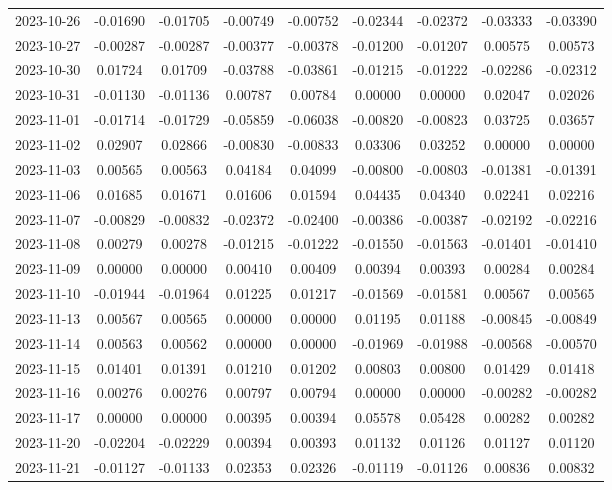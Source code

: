 {\begin{footnotesize}
\begin{longtable}{lcccccccc}
2023-10-26 & -0.01690 & -0.01705 & -0.00749 & -0.00752 & -0.02344 & -0.02372 & -0.03333 & -0.03390 \\
2023-10-27 & -0.00287 & -0.00287 & -0.00377 & -0.00378 & -0.01200 & -0.01207 & 0.00575 & 0.00573 \\
2023-10-30 & 0.01724 & 0.01709 & -0.03788 & -0.03861 & -0.01215 & -0.01222 & -0.02286 & -0.02312 \\
2023-10-31 & -0.01130 & -0.01136 & 0.00787 & 0.00784 & 0.00000 & 0.00000 & 0.02047 & 0.02026 \\
2023-11-01 & -0.01714 & -0.01729 & -0.05859 & -0.06038 & -0.00820 & -0.00823 & 0.03725 & 0.03657 \\
2023-11-02 & 0.02907 & 0.02866 & -0.00830 & -0.00833 & 0.03306 & 0.03252 & 0.00000 & 0.00000 \\
2023-11-03 & 0.00565 & 0.00563 & 0.04184 & 0.04099 & -0.00800 & -0.00803 & -0.01381 & -0.01391 \\
2023-11-06 & 0.01685 & 0.01671 & 0.01606 & 0.01594 & 0.04435 & 0.04340 & 0.02241 & 0.02216 \\
2023-11-07 & -0.00829 & -0.00832 & -0.02372 & -0.02400 & -0.00386 & -0.00387 & -0.02192 & -0.02216 \\
2023-11-08 & 0.00279 & 0.00278 & -0.01215 & -0.01222 & -0.01550 & -0.01563 & -0.01401 & -0.01410 \\
2023-11-09 & 0.00000 & 0.00000 & 0.00410 & 0.00409 & 0.00394 & 0.00393 & 0.00284 & 0.00284 \\
2023-11-10 & -0.01944 & -0.01964 & 0.01225 & 0.01217 & -0.01569 & -0.01581 & 0.00567 & 0.00565 \\
2023-11-13 & 0.00567 & 0.00565 & 0.00000 & 0.00000 & 0.01195 & 0.01188 & -0.00845 & -0.00849 \\
2023-11-14 & 0.00563 & 0.00562 & 0.00000 & 0.00000 & -0.01969 & -0.01988 & -0.00568 & -0.00570 \\
2023-11-15 & 0.01401 & 0.01391 & 0.01210 & 0.01202 & 0.00803 & 0.00800 & 0.01429 & 0.01418 \\
2023-11-16 & 0.00276 & 0.00276 & 0.00797 & 0.00794 & 0.00000 & 0.00000 & -0.00282 & -0.00282 \\
2023-11-17 & 0.00000 & 0.00000 & 0.00395 & 0.00394 & 0.05578 & 0.05428 & 0.00282 & 0.00282 \\
2023-11-20 & -0.02204 & -0.02229 & 0.00394 & 0.00393 & 0.01132 & 0.01126 & 0.01127 & 0.01120 \\
2023-11-21 & -0.01127 & -0.01133 & 0.02353 & 0.02326 & -0.01119 & -0.01126 & 0.00836 & 0.00832 \\

\end{longtable}
\end{footnotesize}}
